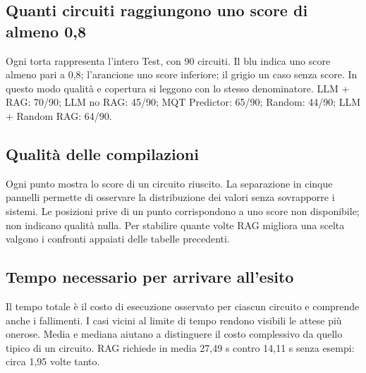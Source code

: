 \subsection{Quanti circuiti raggiungono uno score di almeno 0,8}
\begingroup\small Ogni torta rappresenta l’intero Test, con 90 circuiti. Il blu indica uno score almeno pari a 0,8; l’arancione uno score inferiore; il grigio un caso senza score. In questo modo qualità e copertura si leggono con lo stesso denominatore. LLM + RAG: 70/90; LLM no RAG: 45/90; MQT Predictor: 65/90; Random: 44/90; LLM + Random RAG: 64/90.\par\endgroup
\begin{center}

\end{center}\restoregeometry
\clearpage{}\captionsetup{hypcap=false}
\subsection{Qualità delle compilazioni}
\begingroup\small Ogni punto mostra lo score di un circuito riuscito. La separazione in cinque pannelli permette di osservare la distribuzione dei valori senza sovrapporre i sistemi. Le posizioni prive di un punto corrispondono a uno score non disponibile; non indicano qualità nulla. Per stabilire quante volte RAG migliora una scelta valgono i confronti appaiati delle tabelle precedenti.\par\endgroup
\begin{center}

\end{center}\restoregeometry
\clearpage{}\captionsetup{hypcap=false}
\subsection{Tempo necessario per arrivare all’esito}
\begingroup\small Il tempo totale è il costo di esecuzione osservato per ciascun circuito e comprende anche i fallimenti. I casi vicini al limite di tempo rendono visibili le attese più onerose. Media e mediana aiutano a distinguere il costo complessivo da quello tipico di un circuito. RAG richiede in media 27,49 s contro 14,11 s senza esempi: circa 1,95 volte tanto.\par\endgroup
\begin{center}

\end{center}\restoregeometry
\clearpage{}\captionsetup{hypcap=false}
